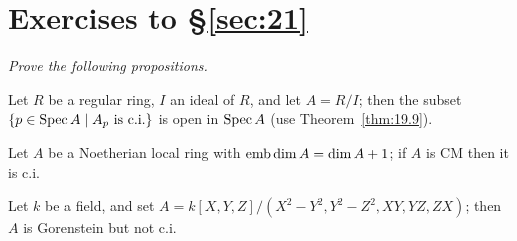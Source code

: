 \section*{Exercises to \S\ref{sec:21}}
\emph{Prove the following propositions.}

\begin{exercise}\label{ex:21.1-ex}
Let $R$ be a regular ring, $I$ an ideal of $R$, and let $A = R/I$; then the subset
$\{p \in \operatorname{Spec} A \mid A_p \text{ is c.i.}\}$ is open in $\operatorname{Spec} A$ (use Theorem~\ref{thm:19.9}).
\end{exercise}

\begin{exercise}\label{ex:21.2-ex}
Let $A$ be a Noetherian local ring with $\operatorname{emb\,dim} A = \dim A + 1$; if $A$ is CM
then it is c.i.
\end{exercise}

\begin{exercise}\label{ex:21.3-ex}
Let $k$ be a field, and set $A = k[X, Y, Z]/(X^2 - Y^2, Y^2 - Z^2, XY, YZ, ZX)$;
then $A$ is Gorenstein but not c.i.
\end{exercise}
